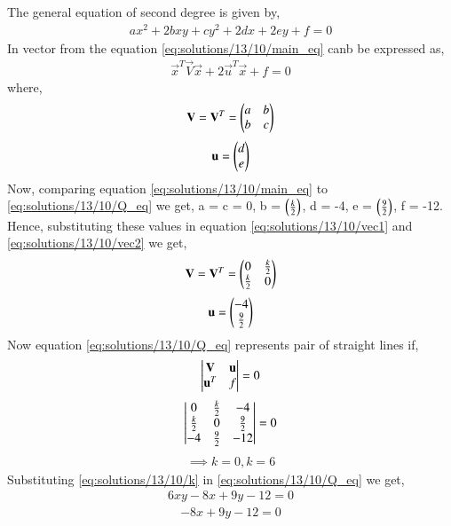 The general equation of second degree is given by,
\begin{align}
ax^2 + 2bxy + cy^2 + 2dx +2ey +f = 0
\label{eq:solutions/13/10/main_eq}
\end{align}
In vector from the equation \eqref{eq:solutions/13/10/main_eq} canb be expressed as,
\begin{align}
\vec{x}^T\vec{V}\vec{x} + 2\vec{u}^T\vec{x} + f = 0 
\label{eq:solutions/13/10/line_vec}
\end{align}
where,
\begin{align}
\mathbf{V} = \mathbf{V}^T = \begin{pmatrix}a&b\\b&c\end{pmatrix}
\label{eq:solutions/13/10/vec1}
\end{align}
\begin{align}
\mathbf{u} = \begin{pmatrix}d\\e\end{pmatrix}
\label{eq:solutions/13/10/vec2}
\end{align}
Now, comparing equation \eqref{eq:solutions/13/10/main_eq} to \eqref{eq:solutions/13/10/Q_eq} we get, a = c = 0, b = $\left(\frac{k}{2}\right)$, d = -4, e = $\left(\frac{9}{2}\right)$, f = -12.  
Hence, substituting these values in equation \eqref{eq:solutions/13/10/vec1} and \eqref{eq:solutions/13/10/vec2} we get,
\begin{align}
\mathbf{V} = \mathbf{V}^T = \begin{pmatrix}0&\frac{k}{2}\\\frac{k}{2}&0\end{pmatrix}
\end{align}
\begin{align}
\mathbf{u} = \begin{pmatrix}-4\\\frac{9}{2}\end{pmatrix}
\end{align}
Now equation \eqref{eq:solutions/13/10/Q_eq} represents pair of straight lines if,
\begin{align}
\begin{vmatrix}\mathbf{V}&\mathbf{u}\\\mathbf{u}^T&f\end{vmatrix} = 0
\end{align}
\begin{align}
\begin{vmatrix}0&\frac{k}{2}&-4\\\frac{k}{2}&0&\frac{9}{2}\\-4&\frac{9}{2}&-12\end{vmatrix} = 0
\end{align}
\begin{align}
\implies k =0 , k = 6 
\label{eq:solutions/13/10/k}
\end{align}
Substituting \eqref{eq:solutions/13/10/k} in \eqref{eq:solutions/13/10/Q_eq} we get,
\begin{align}
6xy-8x+9y-12 = 0
\end{align}
\begin{align}
-8x+9y-12 = 0
\end{align}
